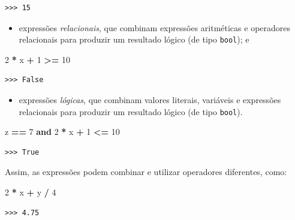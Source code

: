 \documentclass[
]{book}
\newenvironment{Shaded}{\begin{snugshade}}{\end{snugshade}}
\newcommand{\DecValTok}[1]{\textcolor[rgb]{0.00,0.00,0.81}{#1}}
\newcommand{\KeywordTok}[1]{\textcolor[rgb]{0.13,0.29,0.53}{\textbf{#1}}}
\newcommand{\NormalTok}[1]{#1}
\newcommand{\OperatorTok}[1]{\textcolor[rgb]{0.81,0.36,0.00}{\textbf{#1}}}
\providecommand{\tightlist}{%
  \setlength{\itemsep}{0pt}\setlength{\parskip}{0pt}}
\begin{document}
\begin{verbatim}
>>> 15
\end{verbatim}

\begin{itemize}
\tightlist
\item
  expressões \emph{relacionais}, que combinam expressões aritméticas e operadores relacionais para produzir um resultado lógico (de tipo \texttt{bool}); e
\end{itemize}

\begin{Shaded}
\begin{Highlighting}[]
\DecValTok{2} \OperatorTok{*}\NormalTok{ x }\OperatorTok{+} \DecValTok{1} \OperatorTok{\textgreater{}=} \DecValTok{10}
\end{Highlighting}
\end{Shaded}

\begin{verbatim}
>>> False
\end{verbatim}

\begin{itemize}
\tightlist
\item
  expressões \emph{lógicas}, que combinam valores literais, variáveis e expressões relacionais para produzir um resultado lógico (de tipo \texttt{bool}).
\end{itemize}

\begin{Shaded}
\begin{Highlighting}[]
\NormalTok{z }\OperatorTok{==} \DecValTok{7} \KeywordTok{and} \DecValTok{2} \OperatorTok{*}\NormalTok{ x }\OperatorTok{+} \DecValTok{1} \OperatorTok{\textless{}=} \DecValTok{10}
\end{Highlighting}
\end{Shaded}

\begin{verbatim}
>>> True
\end{verbatim}

Assim, as expressões podem combinar e utilizar operadores diferentes, como:

\begin{Shaded}
\begin{Highlighting}[]
\DecValTok{2} \OperatorTok{*}\NormalTok{ x }\OperatorTok{+}\NormalTok{  y }\OperatorTok{/} \DecValTok{4}
\end{Highlighting}
\end{Shaded}

\begin{verbatim}
>>> 4.75
\end{verbatim}
\end{document}
